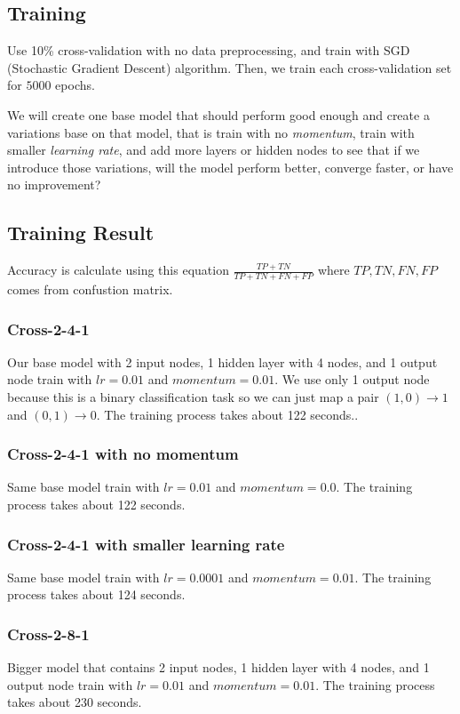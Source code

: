 \documentclass{article}
\begin{document}
\subsection*{Training}
Use 10\% cross-validation with no data preprocessing, and train with SGD (Stochastic Gradient Descent) algorithm. Then, we train each cross-validation set for $5000$ epochs.

We will create one base model that should perform good enough 
and create a variations base on that model, that is train 
with no \emph{momentum}, train with smaller \emph{learning rate}, 
and add more layers or hidden nodes to see that if we introduce 
those variations, will the model perform better, converge faster, or have no improvement?

\subsection*{Training Result}
Accuracy is calculate using this equation $\frac{TP+TN}{TP+TN+FN+FP}$ where $TP, TN, FN, FP$ comes from confustion matrix.
\subsubsection*{Cross-2-4-1}
Our base model with 2 input nodes, 1 hidden layer with 4 nodes, and 1 output node train with $lr = 0.01$ and $momentum = 0.01$. We use only 1 output node because this is a binary classification task so we can just map a pair $(1, 0) \rightarrow 1$ and $(0, 1) \rightarrow 0$.
The training process takes about 122 seconds..
\subsubsection*{Cross-2-4-1 with no momentum}
Same base model train with $lr = 0.01$ and $momentum = 0.0$.
The training process takes about 122 seconds.
\subsubsection*{Cross-2-4-1 with smaller learning rate}
Same base model train with $lr = 0.0001$ and $momentum = 0.01$.
The training process takes about 124 seconds.
\subsubsection*{Cross-2-8-1}
Bigger model that contains 2 input nodes, 1 hidden layer with 4 nodes, and 1 output node train with $lr = 0.01$ and $momentum = 0.01$.
The training process takes about 230 seconds.
\end{document}
